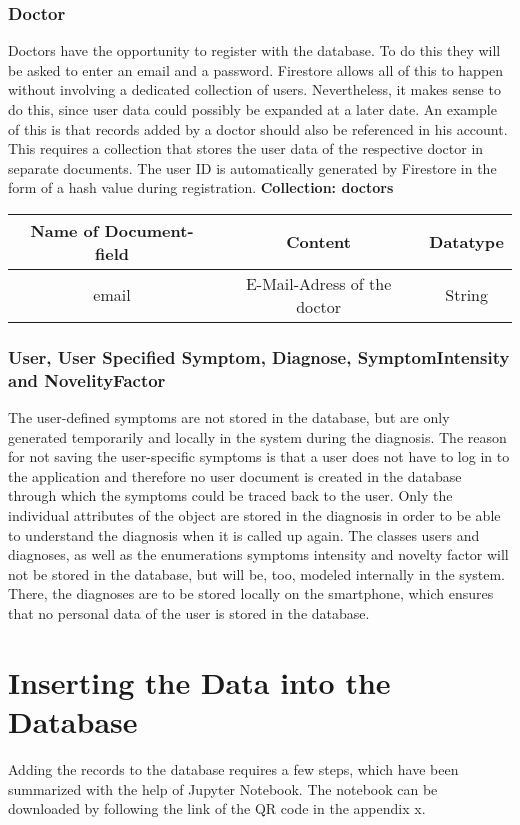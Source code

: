 \subsubsection{Doctor}
Doctors have the opportunity to register with the database. To do this they will be asked to enter an email and a password. Firestore allows all of this to happen without involving a dedicated collection of users. Nevertheless, it makes sense to do this, since user data could possibly be expanded at a later date. An example of this is that records added by a doctor should also be referenced in his account. This requires a collection that stores the user data of the respective doctor in separate documents. The user ID is automatically generated by Firestore in the form of a hash value during registration.
\textbf{Collection: doctors}
		\begin{center}
			\begin{tabular}{ | c| c| c | } 
  				\hline
  				Name of Document-field& Content & Datatype \\  
  				\hline
  				email & E-Mail-Adress of the doctor & String \\
  				\hline
			\end{tabular}
		\end{center}
\subsubsection{User, User Specified Symptom, Diagnose, SymptomIntensity and NovelityFactor}
The user-defined symptoms are not stored in the database, but are only generated temporarily and locally in the system during the diagnosis. The reason for not saving the user-specific symptoms is that a user does not have to log in to the application and therefore no user document is created in the database through which the symptoms could be traced back to the user. Only the individual attributes of the object are stored in the diagnosis in order to be able to understand the diagnosis when it is called up again. The classes users and diagnoses, as well as the enumerations symptoms intensity and novelty factor will not be stored in the database, but will be, too, modeled internally in the system. There, the diagnoses are to be stored locally on the smartphone, which ensures that no personal data of the user is stored in the database.

\section{Inserting the Data into the Database}
Adding the records to the database requires a few steps, which have been summarized with the help of Jupyter Notebook. The notebook can be downloaded by following the link of the QR code in the appendix x.

